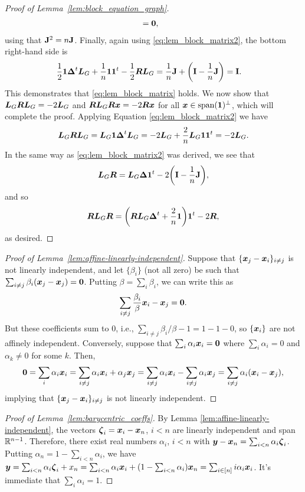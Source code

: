 \begin{proof}[Proof of Lemma~\ref{lem:block_equation_graph}]
\begin{align*}
	&=\vb{0},
	\end{align*}
	using that $\vb{J}^2 = n \vb{J}$. Finally, again using \eqref{eq:lem_block_matrix2}, the bottom right-hand side is 
	\begin{align*}
	\frac{1}{2}\vb{1} \vb*{\Delta}^t \vb*{L}_G + \frac{1}{n}\vb{1}\vb{1}^t - \frac{1}{2}\vb*{R}\vb*{L}_G &= \frac{1}{n}\vb{J} + \bigg(\vb{I}-\frac{1}{n}\vb{J}\bigg) = \vb{I}.
	\end{align*}
	This demonstrates that \eqref{eq:lem_block_matrix} holds. We now show that $\vb*{L}_G \vb*{R}\vb*{L}_G = -2 \vb*{L}_G$ and $\vb*{R}\vb*{L}_G\vb*{R}\vb*{x} = -2\vb*{R}\vb*{x}$ for all $\vb*{x}\in\textnormal{span}(\vb{1})^\perp$, which will complete the proof. Applying Equation \eqref{eq:lem_block_matrix2} we have 
	\begin{align*}
	\vb*{L}_G\vb*{R}\vb*{L}_G = \vb*{L}_G\vb{1} \vb*{\Delta}^t\vb*{L}_G = -2\vb*{L}_G+ \frac{2}{n}\vb*{L}_G\vb{1}\vb{1}^t = -2\vb*{L}_G.
	\end{align*}
	In the same way as \eqref{eq:lem_block_matrix2} was derived, we see that 
	\begin{equation*}
	\vb*{L}_G\vb*{R} = \vb*{L}_G\vb*{\Delta}\vb{1}^t - 2\bigg(\vb{I}-\frac{1}{n}\vb{J}\bigg),
	\end{equation*}
	and so 
	\begin{equation*}
	\vb*{R}\vb*{L}_G\vb*{R}= \bigg(\vb*{R}\vb*{L}_G\vb*{\Delta}^t + \frac{2}{n}\vb{1} \bigg)\vb{1}^t -2\vb*{R},
	\end{equation*}
	as desired. 
\end{proof}


\begin{proof}[Proof of Lemma~\ref{lem:affine-linearly-independent}]
	Suppose that $\{\vb*{x}_j-\vb*{x}_i\}_{i\neq j}$ is not linearly independent, and let $\{\beta_i\}$ (not all zero) be such that $\sum_{i\neq j}\beta_i (\vb*{x}_j-\vb*{x}_j)=\vb{0}$. Putting $\beta=\sum_i \beta_i$, we can write this as 
	\[\sum_{i\neq j}\frac{\beta_i}{\beta}\vb*{x}_i - \vb*{x}_j=\vb{0}.\]
	But these coefficients sum to 0, i.e., $\sum_{i\neq j}\beta_i/\beta -1=1-1-0$, so $\{\vb*{x}_i\}$ are not affinely independent. Conversely, suppose that $\sum_i\alpha_i\vb*{x}_i=\vb{0}$ where $\sum_i\alpha_i=0$ and $\alpha_k\neq 0$ for some $k$. Then, 
	\[\vb{0} =\sum_i\alpha_i\vb*{x}_i = \sum_{i\neq j}\alpha_i\vb*{x}_i + \alpha_j\vb*{x}_j = \sum_{i\neq j}\alpha_i\vb*{x}_i - \sum_{i\neq j}\alpha_i\vb*{x}_j = \sum_{i\neq j}\alpha_i(\vb*{x}_i-\vb*{x}_j), \]
	implying that $\{\vb*{x}_j-\vb*{x}_i\}_{i\neq j}$ is not linearly independent. 
\end{proof}

\begin{proof}[Proof of Lemma~\ref{lem:barycentric_coeffs}]
	By Lemma \ref{lem:affine-linearly-independent}, the vectors $\vb*{\zeta}_i=\vb*{x}_i-\vb*{x}_n$, $i<n$ are linearly independent and span $\mathbb{R}^{n-1}$. Therefore, there exist real numbers $\alpha_i$, $i<n$ with $\vb*{y}-\vb*{x}_n = \sum_{i<n} \alpha_i\vb*{\zeta}_i$. Putting $\alpha_n=1-\sum_{i<n}\alpha_i$, we have $\vb*{y}=\sum_{i<n}\alpha_i\vb*{\zeta}_i + x_n = \sum_{i<n} \alpha_i\vb*{x}_i + (1-\sum_{i<n}\alpha_i)\vb*{x}_n = \sum_{i\in[n]}i \alpha_i\vb*{x}_i$. It's immediate that $\sum_i\alpha_i=1$. 
\end{proof}

